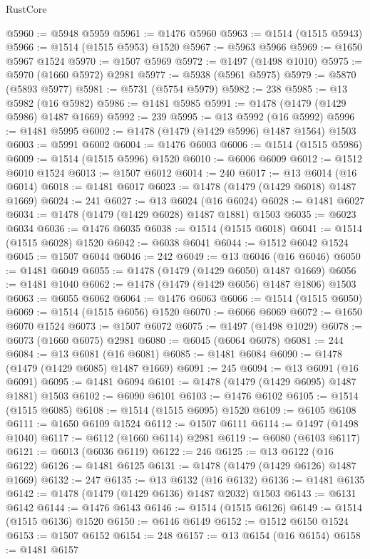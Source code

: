 \begin{lexlean}{RustCore}
\begin{coremodule}
@5960 := @5948 @5959
@5961 := @1476 @5960
@5963 := @1514 (@1515 @5943)
@5966 := @1514 (@1515 @5953) @1520
@5967 := @5963 @5966
@5969 := @1650 @5967 @1524
@5970 := @1507 @5969
@5972 := @1497 (@1498 @1010)
@5975 := @5970 (@1660 @5972) @2981
@5977 := @5938 (@5961 @5975)
@5979 := @5870 (@5893 @5977)
@5981 := @5731 (@5754 @5979)
@5982 := 238
@5985 := @13 @5982 (@16 @5982)
@5986 := @1481 @5985
@5991 := @1478 (@1479 (@1429 @5986) @1487 @1669)
@5992 := 239
@5995 := @13 @5992 (@16 @5992)
@5996 := @1481 @5995
@6002 := @1478 (@1479 (@1429 @5996) @1487 @1564) @1503
@6003 := @5991 @6002
@6004 := @1476 @6003
@6006 := @1514 (@1515 @5986)
@6009 := @1514 (@1515 @5996) @1520
@6010 := @6006 @6009
@6012 := @1512 @6010 @1524
@6013 := @1507 @6012
@6014 := 240
@6017 := @13 @6014 (@16 @6014)
@6018 := @1481 @6017
@6023 := @1478 (@1479 (@1429 @6018) @1487 @1669)
@6024 := 241
@6027 := @13 @6024 (@16 @6024)
@6028 := @1481 @6027
@6034 := @1478 (@1479 (@1429 @6028) @1487 @1881) @1503
@6035 := @6023 @6034
@6036 := @1476 @6035
@6038 := @1514 (@1515 @6018)
@6041 := @1514 (@1515 @6028) @1520
@6042 := @6038 @6041
@6044 := @1512 @6042 @1524
@6045 := @1507 @6044
@6046 := 242
@6049 := @13 @6046 (@16 @6046)
@6050 := @1481 @6049
@6055 := @1478 (@1479 (@1429 @6050) @1487 @1669)
@6056 := @1481 @1040
@6062 := @1478 (@1479 (@1429 @6056) @1487 @1806) @1503
@6063 := @6055 @6062
@6064 := @1476 @6063
@6066 := @1514 (@1515 @6050)
@6069 := @1514 (@1515 @6056) @1520
@6070 := @6066 @6069
@6072 := @1650 @6070 @1524
@6073 := @1507 @6072
@6075 := @1497 (@1498 @1029)
@6078 := @6073 (@1660 @6075) @2981
@6080 := @6045 (@6064 @6078)
@6081 := 244
@6084 := @13 @6081 (@16 @6081)
@6085 := @1481 @6084
@6090 := @1478 (@1479 (@1429 @6085) @1487 @1669)
@6091 := 245
@6094 := @13 @6091 (@16 @6091)
@6095 := @1481 @6094
@6101 := @1478 (@1479 (@1429 @6095) @1487 @1881) @1503
@6102 := @6090 @6101
@6103 := @1476 @6102
@6105 := @1514 (@1515 @6085)
@6108 := @1514 (@1515 @6095) @1520
@6109 := @6105 @6108
@6111 := @1650 @6109 @1524
@6112 := @1507 @6111
@6114 := @1497 (@1498 @1040)
@6117 := @6112 (@1660 @6114) @2981
@6119 := @6080 (@6103 @6117)
@6121 := @6013 (@6036 @6119)
@6122 := 246
@6125 := @13 @6122 (@16 @6122)
@6126 := @1481 @6125
@6131 := @1478 (@1479 (@1429 @6126) @1487 @1669)
@6132 := 247
@6135 := @13 @6132 (@16 @6132)
@6136 := @1481 @6135
@6142 := @1478 (@1479 (@1429 @6136) @1487 @2032) @1503
@6143 := @6131 @6142
@6144 := @1476 @6143
@6146 := @1514 (@1515 @6126)
@6149 := @1514 (@1515 @6136) @1520
@6150 := @6146 @6149
@6152 := @1512 @6150 @1524
@6153 := @1507 @6152
@6154 := 248
@6157 := @13 @6154 (@16 @6154)
@6158 := @1481 @6157

\end{coremodule}
\end{lexlean}
